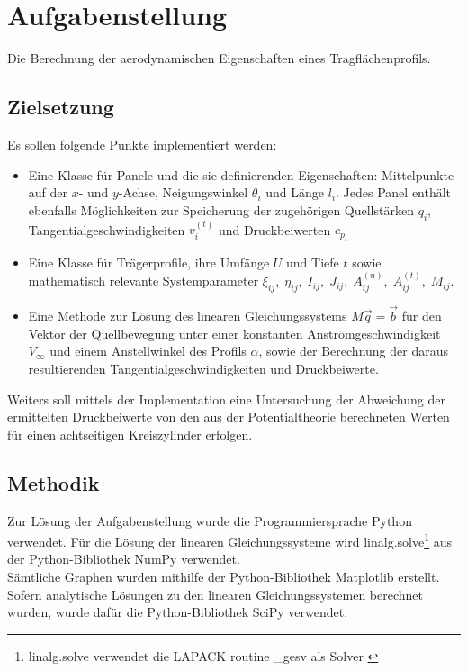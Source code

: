 \chapter{Aufgabenstellung}
Die Berechnung der aerodynamischen Eigenschaften eines Tragflächenprofils.

\section{Zielsetzung}
Es sollen folgende Punkte implementiert werden:
\begin{itemize}
  \item Eine Klasse für Panele und die sie definierenden Eigenschaften: Mittelpunkte auf der $x$- und $y$-Achse, Neigungswinkel $\theta_{i}$ und Länge $l_i$. Jedes Panel enthält ebenfalls Möglichkeiten zur Speicherung der zugehörigen Quellstärken $q_i$, Tangentialgeschwindigkeiten $v_i^{(t)}$ und Druckbeiwerten $c_{p_i}$
  \item Eine Klasse für Trägerprofile, ihre Umfänge $U$ und Tiefe $t$ sowie mathematisch relevante Systemparameter $\xi_{ij}, \; \eta_{ij}, \; I_{ij}, \; J_{ij}, \; A_{ij}^{(n)}, \;A_{ij}^{(t)}, \;M_{ij}$.
  \item Eine Methode zur Lösung des linearen Gleichungssystems $M \vec q = \vec b$ für den Vektor der Quellbewegung unter einer konstanten Anströmgeschwindigkeit $V_{\infty}$ und einem Anstellwinkel des Profils $\alpha $, sowie der Berechnung der daraus resultierenden Tangentialgeschwindigkeiten und Druckbeiwerte.
\end{itemize}
Weiters soll mittels der Implementation eine Untersuchung der Abweichung der ermittelten Druckbeiwerte von den aus der Potentialtheorie berechneten Werten für einen achtseitigen Kreiszylinder erfolgen.

\section{Methodik}
Zur Lösung der Aufgabenstellung wurde die Programmiersprache Python verwendet. Für die Lösung der linearen Gleichungssysteme wird linalg.solve\footnote{linalg.solve verwendet die LAPACK routine \_gesv als Solver \cite{harris2020array}} aus der Python-Bibliothek NumPy verwendet.\\Sämtliche Graphen wurden mithilfe der Python-Bibliothek Matplotlib erstellt. \cite{Hunter:2007} Sofern analytische Lösungen zu den linearen Gleichungssystemen berechnet wurden, wurde dafür die Python-Bibliothek SciPy verwendet. \cite{2020SciPy-NMeth}
